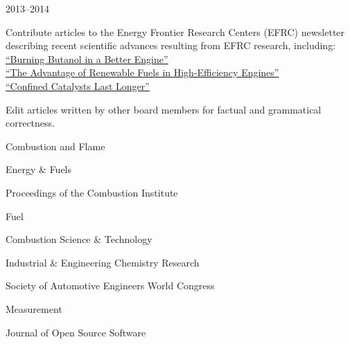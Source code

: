 \begin{lonelist}
\item[]  \hfill 2013--2014\\

\begin{innerlist}
    \item Contribute articles to the Energy Frontier Research Centers (EFRC) newsletter
    describing recent scientific advances resulting from EFRC research, including:\\
    \hspace*{0.25in}\href{http://www.energyfrontier.us/newsletter/201210/burning-butanol-better-engine}
    {``Burning Butanol in a Better Engine''}\\
    \hspace*{0.25in}\href{http://www.energyfrontier.us/newsletter/201401/advantage-renewable-fuels-high-efficiency-engines}
    {``The Advantage of Renewable Fuels in High-Efficiency Engines''}\\
    \hspace*{0.25in}\href{http://www.energyfrontier.us/newsletter/201404/confined-catalysts-last-longer}
    {``Confined Catalysts Last Longer''}
    \item Edit articles written by other board members for factual and grammatical
    correctness.
\end{innerlist}

\item[] 
   \begin{innerlist}
       \item Combustion and Flame
       \item Energy \& Fuels
       \item Proceedings of the Combustion Institute
       \item Fuel
       \item Combustion Science \& Technology
       \item Industrial \& Engineering Chemistry Research
       \item Society of Automotive Engineers World Congress
       \item Measurement
       \item Journal of Open Source Software
   \end{innerlist}

\end{lonelist}

\vspace{\baselineskip}

